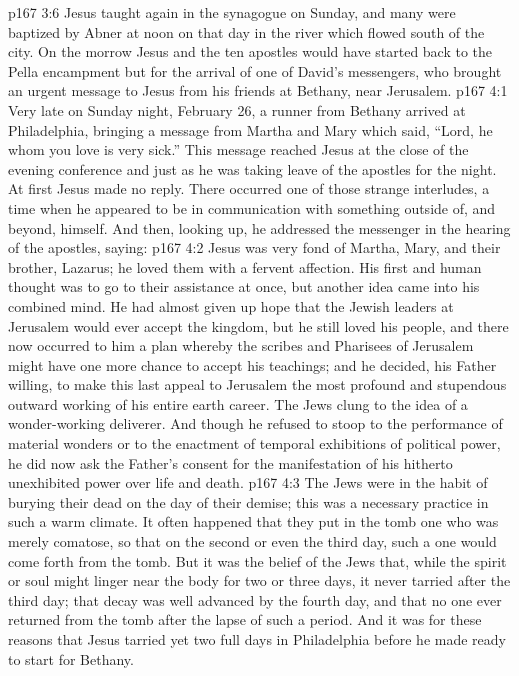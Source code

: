 \vs p167 3:6 \pc Jesus taught again in the synagogue on Sunday, and many were baptized by Abner at noon on that day in the river which flowed south of the city. On the morrow Jesus and the ten apostles would have started back to the Pella encampment but for the arrival of one of David’s messengers, who brought an urgent message to Jesus from his friends at Bethany, near Jerusalem.
\vs p167 4:1 Very late on Sunday night, February 26, a runner from Bethany arrived at Philadelphia, bringing a message from Martha and Mary which said, “Lord, he whom you love is very sick.” This message reached Jesus at the close of the evening conference and just as he was taking leave of the apostles for the night. At first Jesus made no reply. There occurred one of those strange interludes, a time when he appeared to be in communication with something outside of, and beyond, himself. And then, looking up, he addressed the messenger in the hearing of the apostles, saying: 
\vs p167 4:2 \pc Jesus was very fond of Martha, Mary, and their brother, Lazarus; he loved them with a fervent affection. His first and human thought was to go to their assistance at once, but another idea came into his combined mind. He had almost given up hope that the Jewish leaders at Jerusalem would ever accept the kingdom, but he still loved his people, and there now occurred to him a plan whereby the scribes and Pharisees of Jerusalem might have one more chance to accept his teachings; and he decided, his Father willing, to make this last appeal to Jerusalem the most profound and stupendous outward working of his entire earth career. The Jews clung to the idea of a wonder\hyp{}working deliverer. And though he refused to stoop to the performance of material wonders or to the enactment of temporal exhibitions of political power, he did now ask the Father’s consent for the manifestation of his hitherto unexhibited power over life and death.
\vs p167 4:3 \pc The Jews were in the habit of burying their dead on the day of their demise; this was a necessary practice in such a warm climate. It often happened that they put in the tomb one who was merely comatose, so that on the second or even the third day, such a one would come forth from the tomb. But it was the belief of the Jews that, while the spirit or soul might linger near the body for two or three days, it never tarried after the third day; that decay was well advanced by the fourth day, and that no one ever returned from the tomb after the lapse of such a period. And it was for these reasons that Jesus tarried yet two full days in Philadelphia before he made ready to start for Bethany.
